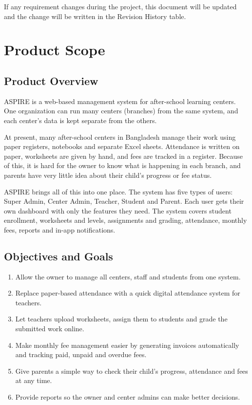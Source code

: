If any requirement changes during the project, this document will be updated
and the change will be written in the Revision History table.

\section{Product Scope}\label{sec:scope}

\subsection{Product Overview}
ASPIRE is a web-based management system for after-school learning centers. One
organization can run many centers (branches) from the same system, and each
center's data is kept separate from the others.

At present, many after-school centers in Bangladesh manage their work using
paper registers, notebooks and separate Excel sheets. Attendance is written on
paper, worksheets are given by hand, and fees are tracked in a register. Because
of this, it is hard for the owner to know what is happening in each branch, and
parents have very little idea about their child's progress or fee status.

ASPIRE brings all of this into one place. The system has five types of users:
Super Admin, Center Admin, Teacher, Student and Parent. Each user gets their own
dashboard with only the features they need. The system covers student enrollment,
worksheets and levels, assignments and grading, attendance, monthly fees,
reports and in-app notifications.

\subsection{Objectives and Goals}
\begin{enumerate}[label=\textbf{G\arabic*.}]
  \item Allow the owner to manage all centers, staff and students from one system.
  \item Replace paper-based attendance with a quick digital attendance system for teachers.
  \item Let teachers upload worksheets, assign them to students and grade the
        submitted work online.
  \item Make monthly fee management easier by generating invoices automatically
        and tracking paid, unpaid and overdue fees.
  \item Give parents a simple way to check their child's progress, attendance
        and fees at any time.
  \item Provide reports so the owner and center admins can make better decisions.
\end{enumerate}

